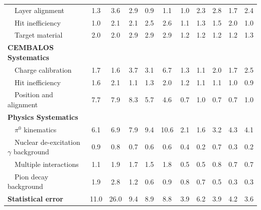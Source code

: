 \begin{table}[htbp]
\begin{center}
\begin{tabular*}{\textwidth}{l|@{\extracolsep{\fill}}ccccc|ccccc}
  ~~Layer alignment& 1.3& 3.6& 2.9& 0.9& 1.1& 1.0& 2.3& 2.8& 1.7& 2.4 \\
  ~~Hit inefficiency& 1.0& 2.1& 2.1& 2.5& 2.6& 1.1& 1.3& 1.5& 2.0& 1.0 \\
  ~~Target material& 2.0& 2.0& 2.9& 2.9& 2.9& 1.2& 1.2& 1.2& 1.2& 1.3 \\
  \hline
  {\bfseries CEMBALOS Systematics} & & & & &  & & & & &\\
  ~~Charge calibration& 1.7& 1.6& 3.7& 3.1& 6.7& 1.3& 1.1& 2.0& 1.7& 2.5 \\
  ~~Hit inefficiency& 1.6& 2.1& 1.1& 1.3& 2.0& 1.2& 1.1& 1.1& 1.0& 0.9 \\
  ~~Position and alignment & 7.7& 7.9& 8.3& 5.7& 4.6& 0.7& 1.0& 0.7& 0.7& 1.0 \\
  \hline
  {\bfseries Physics Systematics} & & & & &  & & & & &\\
  ~~$\pi^{0}$ kinematics& 6.1& 6.9& 7.9& 9.4& 10.6& 2.1& 1.6& 3.2& 4.3& 4.1 \\
  ~~Nuclear de-excitation $\gamma$ background& 0.9& 0.8& 0.7& 0.6& 0.6& 0.4& 0.2& 0.7 & 0.3& 0.2 \\
  ~~Multiple interactions& 1.1 & 1.9 & 1.7 & 1.5 & 1.8 & 0.5& 0.5& 0.8& 0.7& 0.7 \\
  ~~Pion decay background& 1.9 & 2.8& 1.2& 0.6& 0.9& 0.8& 0.7& 0.5& 0.3& 0.3 \\
  \hline
  {\bfseries Statistical error} & 11.0& 26.0& 9.4& 8.9& 8.8& 3.9& 6.2& 3.9& 4.2& 3.6 \\

\end{tabular*}
\end{center}
\end{table}

